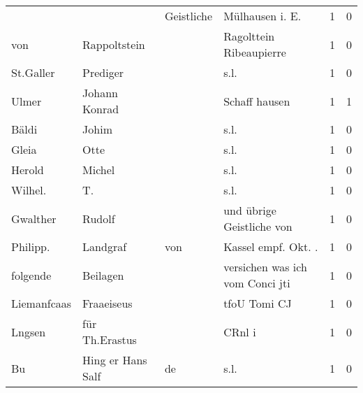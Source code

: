 \begin{tabular}{llllrr}
                          &                                    &  Geistliche &                            Mülhausen i. E.  &          1 &         0 \\
                      von &                       Rappoltstein &             &                     Ragolttein Ribeaupierre &          1 &         0 \\
                St.Galler &                           Prediger &             &                                        s.l. &          1 &         0 \\
                    Ulmer &                      Johann Konrad &             &                               Schaff hausen &          1 &         1 \\
                    Bäldi &                              Johim &             &                                        s.l. &          1 &         0 \\
                    Gleia &                               Otte &             &                                        s.l. &          1 &         0 \\
                   Herold &                             Michel &             &                                        s.l. &          1 &         0 \\
                  Wilhel. &                                 T. &             &                                        s.l. &          1 &         0 \\
                 Gwalther &                             Rudolf &             &                   und übrige Geistliche von &          1 &         0 \\
                 Philipp. &                           Landgraf &         von &                        Kassel empf. Okt. .  &          1 &         0 \\
                 folgende &                           Beilagen &             &             versichen was ich vom Conci jti &          1 &         0 \\
              Liemanfcaas &                         Fraaeiseus &             &                                tfoU Tomi CJ &          1 &         0 \\
                   Lngsen &                     für Th.Erastus &             &                                      CRnl i &          1 &         0 \\
                       Bu &                  Hing er Hans Salf &          de &                                        s.l. &          1 &         0 \\

\end{tabular}
